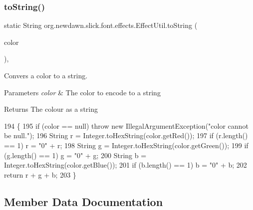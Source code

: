 \subsubsection{\texorpdfstring{to\+String()}{toString()}}
{\footnotesize\ttfamily static String org.\+newdawn.\+slick.\+font.\+effects.\+Effect\+Util.\+to\+String (\begin{DoxyParamCaption}\item[{Color}]{color }\end{DoxyParamCaption})\hspace{0.3cm}{\ttfamily [inline]}, {\ttfamily [static]}}

Convers a color to a string.


\begin{DoxyParams}{Parameters}
{\em color} & The color to encode to a string \\
\hline
\end{DoxyParams}
\begin{DoxyReturn}{Returns}
The colour as a string 
\end{DoxyReturn}

\begin{DoxyCode}
194                                                 \{
195         \textcolor{keywordflow}{if} (color == null) \textcolor{keywordflow}{throw} \textcolor{keyword}{new} IllegalArgumentException(\textcolor{stringliteral}{"color cannot be null."});
196         String r = Integer.toHexString(color.getRed());
197         \textcolor{keywordflow}{if} (r.length() == 1) r = \textcolor{stringliteral}{"0"} + r;
198         String g = Integer.toHexString(color.getGreen());
199         \textcolor{keywordflow}{if} (g.length() == 1) g = \textcolor{stringliteral}{"0"} + g;
200         String b = Integer.toHexString(color.getBlue());
201         \textcolor{keywordflow}{if} (b.length() == 1) b = \textcolor{stringliteral}{"0"} + b;
202         \textcolor{keywordflow}{return} r + g + b;
203     \}
\end{DoxyCode}


\subsection{Member Data Documentation}
\mbox{\label{classorg_1_1newdawn_1_1slick_1_1font_1_1effects_1_1_effect_util_ae765205c4bea974106e097078f83cb6b}} 
